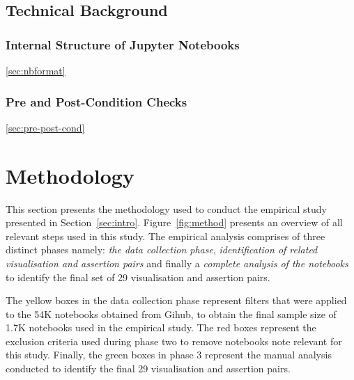 \documentclass[acmsmall,screen,review,anonymous]{acmart}
\begin{document}


\subsection{Technical Background}\label{sec:background}
\subsubsection{Internal Structure of Jupyter Notebooks}\ref{sec:nbformat}

\subsubsection{Pre and Post-Condition Checks}\ref{sec:pre-post-cond}


\section{Methodology}\label{sec:method}

This section presents the methodology used to conduct the empirical
study presented in Section~\ref{sec:intro}. Figure~\ref{fig:method}
presents an overview of all relevant steps used in this study. The
empirical analysis comprises of three distinct phases namely:
\textit{the data collection phase}, \textit{identification of related
visualisation and assertion pairs} and finally a \textit{complete
analysis of the notebooks} to identify the final set of 29
visualisation and assertion pairs.

The yellow boxes in the data collection phase represent filters that
were applied to the 54K notebooks obtained from Gihub, to obtain the
final sample size of 1.7K notebooks used in the empirical study. The red
boxes represent the exclusion criteria used during phase two to remove
notebooks note relevant for this study. Finally, the green boxes in
phase 3 represent the manual analysis conducted to identify the final 29
visualisation and assertion pairs.
\end{document}
